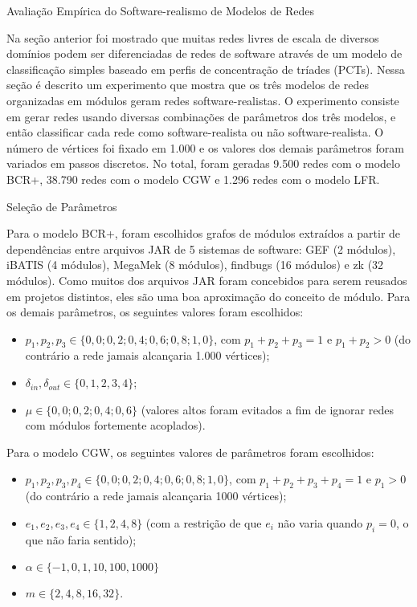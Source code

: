 \begin{section}{Avaliação Empírica do Software-realismo de Modelos de Redes}

Na seção anterior foi mostrado que muitas redes livres de escala de diversos domínios podem ser diferenciadas de redes de software através de um modelo de classificação simples baseado em perfis de concentração de tríades (PCTs). Nessa seção é descrito um experimento que mostra que os três modelos de redes organizadas em módulos geram redes software-realistas. O experimento consiste em gerar redes usando diversas combinações de parâmetros dos três modelos, e então classificar cada rede como software-realista ou não software-realista. O número de vértices foi fixado em 1.000 e os valores dos demais parâmetros foram variados em passos discretos. No total, foram geradas 9.500 redes com o modelo BCR+, 38.790 redes com o modelo CGW e 1.296 redes com o modelo LFR.

\begin{subsection}{Seleção de Parâmetros} \label{sec:parametros}

Para o modelo BCR+, foram escolhidos grafos de módulos extraídos a partir de dependências entre arquivos JAR de 5 sistemas de software: GEF (2 módulos), iBATIS (4 módulos), MegaMek (8 módulos), findbugs (16 módulos) e zk (32 módulos). Como muitos dos arquivos JAR foram concebidos para serem reusados em projetos distintos, eles são uma boa aproximação do conceito de módulo. Para os demais parâmetros, os seguintes valores foram escolhidos:

\begin{itemize}
	\item $p_1, p_2, p_3 \in \{0,0; 0,2; 0,4; 0,6; 0,8; 1,0\}$, com $p_1 + p_2 + p_3 = 1$ e $p_1 + p_2 > 0$ (do contrário a rede jamais alcançaria 1.000 vértices);
	\item $\delta_{in}, \delta_{out} \in \{0, 1, 2, 3, 4\}$;
	\item $\mu \in \{0,0; 0,2; 0,4; 0,6\}$ (valores altos foram evitados a fim de ignorar redes com módulos fortemente acoplados).
\end{itemize}

Para o modelo CGW, os seguintes valores de parâmetros foram escolhidos:

\begin{itemize}
	\item $p_1, p_2, p_3, p_4 \in \{0,0; 0,2; 0,4; 0,6; 0,8; 1,0\}$, com $p_1 + p_2 + p_3 + p_4 = 1$ e $p_1 > 0$ (do contrário a rede jamais alcançaria 1000 vértices);
	\item $e_1, e_2, e_3, e_4 \in \{1, 2, 4, 8\}$ (com a restrição de que $e_i$ não varia quando $p_i = 0$, o que não faria sentido);
	\item $\alpha \in \{-1, 0, 1, 10, 100, 1000\}$
	\item $m \in \{2, 4, 8, 16, 32\}$.
\end{itemize}


\end{subsection}
\end{section}
